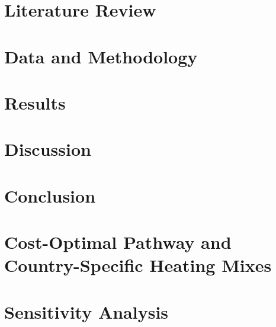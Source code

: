 \documentclass[12pt,a4paper]{article}
\begin{document}
\section{Literature Review}
\label{sec:lit}


\section{Data and Methodology}


\section{Results}




\section{Discussion}


\section{Conclusion}


\newpage



\newpage
\appendix




\section{Cost-Optimal Pathway and Country-Specific Heating Mixes}
\label{sec:costopt}


\section{Sensitivity Analysis}

\end{document}
